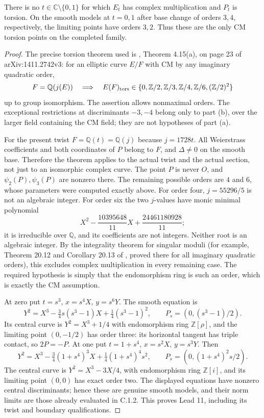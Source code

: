 \begin{statement}
There is no $t\in\mathbb C\setminus\{0,1\}$ for which $E_t$ has
complex multiplication and $P_t$ is torsion. On the smooth models
at $t=0,1$ after base change of orders $3,4$, respectively, the
limiting points have orders $3,2$. Thus these are the only CM
torsion points on the completed family.
\end{statement}
\begin{proof}
The precise torsion theorem used is \cite{BourdonClarkStankewicz2017},
Theorem 4.15(a), on page 23 of arXiv:1411.2742v3:
for an elliptic curve $E/F$ with CM by any imaginary quadratic order,
\[
 F=\mathbb Q(j(E))\quad\Longrightarrow\quad
 E(F)_{\rm tors}\in
 \{0,\mathbb Z/2,\mathbb Z/3,\mathbb Z/4,
       \mathbb Z/6,(\mathbb Z/2)^2\}
\]
up to group isomorphism. The assertion allows nonmaximal orders.
The exceptional restrictions at discriminants $-3,-4$ belong only
to part (b), over the larger field containing the CM field; they
are not hypotheses of part (a).

For the present twist $F=\mathbb Q(t)=\mathbb Q(j)$ because
$j=1728t$. All Weierstrass coefficients and both coordinates of
$P$ belong to $F$, and $\Delta\ne0$ on the smooth base. Therefore
the theorem applies to the actual twist and the actual section,
not just to an isomorphic complex curve. The point $P$ is never
$O$, and $\psi_2(P),\psi_3(P)$ are nonzero there. The remaining
possible orders are $4$ and $6$, whose parameters were computed
exactly above. For order four, $j=55296/5$ is not an algebraic
integer. For order six the two $j$-values have monic minimal
polynomial
\[
 X^2-\frac{10395648}{11}X+\frac{24461180928}{11};
\]
it is irreducible over $\mathbb Q$, and its coefficients are not
integers. Neither root is an algebraic integer. By the integrality
theorem for singular moduli (for example, Theorem 20.12 and
Corollary 20.13 of \cite{Sutherland2023CM}, proved there for all
imaginary quadratic orders), this excludes complex multiplication
in every remaining case. The required hypothesis is simply that
the endomorphism ring is such an order, which is exactly the CM
assumption.

At zero put $t=s^3$, $x=s^4X$, $y=s^6Y$. The smooth equation is
\[
 Y^2=X^3-\tfrac34s(s^3-1)X+\tfrac14(s^3-1)^2,\qquad
 P_s=(0,(s^3-1)/2).
\]
Its central curve is $Y^2=X^3+1/4$ with endomorphism ring
$\mathbb Z[\rho]$, and the limiting point $(0,-1/2)$ has order
three: its horizontal tangent has triple contact, so $2P=-P$.
At one put $t=1+s^4$, $x=s^2X$, $y=s^3Y$. Then
\[
 Y^2=X^3-\tfrac34(1+s^4)^3X+
       \tfrac14(1+s^4)^4s^2,\qquad
 P_s=(0,(1+s^4)^2s/2).
\]
The central curve is $Y^2=X^3-3X/4$, with endomorphism ring
$\mathbb Z[i]$, and its limiting point $(0,0)$ has exact order two.
The displayed equations have nonzero central discriminants; hence
these are genuine smooth models, and their norm limits are those
already evaluated in C.1.2. This proves Lead 11, including its
twist and boundary qualifications.
\end{proof}
